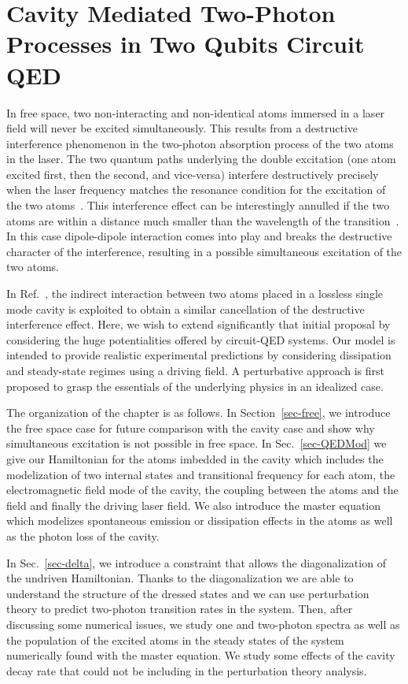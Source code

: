 


\chapter{Cavity Mediated Two-Photon Processes in Two Qubits Circuit QED} \label{ch-6}

In free space, two non-interacting and non-identical atoms immersed in a laser field will never be excited simultaneously. This results from a destructive interference phenomenon in the two-photon absorption process of the two atoms in the laser. The two quantum paths underlying the double excitation (one atom excited first, then the second, and vice-versa) interfere destructively precisely when the laser frequency matches the resonance condition for the excitation of the two atoms~\cite{Kim98}. This interference effect can be interestingly annulled if the two atoms are within a distance much smaller than the wavelength of the transition~\cite{Var92, Orr02, Het02}. In this case dipole-dipole interaction comes into play and breaks the destructive character of the interference, resulting in a possible simultaneous excitation of the two atoms.

In Ref.~\cite{Kim98}, the indirect interaction between two atoms placed in a lossless single mode cavity is exploited to obtain a similar cancellation of the destructive interference effect. Here, we wish to extend significantly that initial proposal by considering the huge potentialities offered by circuit-QED systems. Our model is intended to provide realistic experimental predictions by considering dissipation and steady-state regimes using a driving field. A perturbative approach is first proposed to grasp the essentials of the underlying physics in an idealized case.

The organization of the chapter is as follows. In Section~\ref{sec-free}, we introduce the free space case for future comparison with the cavity case and show why simultaneous excitation is not possible in free space. In Sec.~\ref{sec-QEDMod} we give our Hamiltonian for the atoms imbedded in the cavity which includes the modelization of  two internal  states and transitional frequency for each atom, the electromagnetic field mode of the cavity, the coupling between the atoms and the field and finally the driving laser field. We also introduce the master equation which modelizes spontaneous emission or dissipation effects in the atoms as well as the photon loss of the cavity.

In Sec.~\ref{sec-delta}, we introduce a constraint that allows the diagonalization of the undriven Hamiltonian. Thanks to the diagonalization we are able to understand the structure of the dressed states and we can use perturbation theory to predict two-photon transition rates in the system. Then, after discussing some numerical issues, we study one and two-photon spectra as well as the population of the excited atoms in the steady states of the system numerically found with the master equation. We study some effects of the cavity decay rate that could not be including in the perturbation theory analysis.

